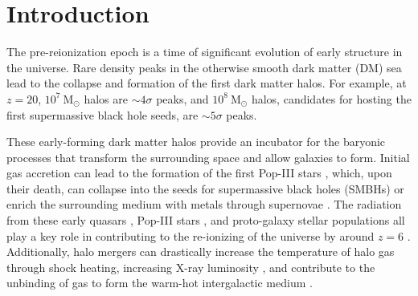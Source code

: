 
%
%

\section{Introduction}
\label{sec:2lpt--introduction}







The pre-reionization epoch is a time of significant evolution of early structure in the universe.  Rare density peaks in the otherwise smooth dark matter (DM) sea lead to the collapse and formation of the first dark matter halos.  For example, at $z = 20$, $10^{7}~\mathrm{M}_{\odot}$ halos are $\sim 4\sigma$ peaks, and $10^{8}~\mathrm{M}_{\odot}$ halos, candidates for hosting the first supermassive black hole seeds, are $\sim 5\sigma$ peaks.

These early-forming dark matter halos provide an incubator for the baryonic processes that transform the surrounding space and allow galaxies to form.  Initial gas accretion can lead to the formation of the first Pop-III stars \citep{1986MNRAS.221...53C, 1997ApJ...474....1T, 2000ApJ...540...39A, 2002Sci...295...93A}, which, upon their death, can collapse into the seeds for supermassive black holes (SMBHs) \citep{2001ApJ...551L..27M, 2003MNRAS.340..647I, 2009ApJ...701L.133A, 2012ApJ...754...34J} or enrich the surrounding medium with metals through supernovae \citep{2002ApJ...567..532H, 2003ApJ...591..288H}.  The radiation from these early quasars \citep{1987ApJ...321L.107S, 1999ApJ...514..648M, 2001AJ....122.2833F}, Pop-III stars \citep{1997ApJ...486..581G, 2003ApJ...584..621V, 2006ApJ...639..621A}, and proto-galaxy stellar populations \citep{2012ApJ...752L...5B, 2012MNRAS.423..862K} all play a key role in contributing to the re-ionizing of the universe by around $z = 6$ \citep{2001PhR...349..125B}.  Additionally, halo mergers can drastically increase the temperature of halo gas through shock heating, increasing X-ray luminosity \citep{2009MNRAS.397..190S}, and contribute to the unbinding of gas to form the warm-hot intergalactic medium \citep{2008SSRv..134..141B, 2010MNRAS.405L..31S, 2012MNRAS.425.2974T}.




